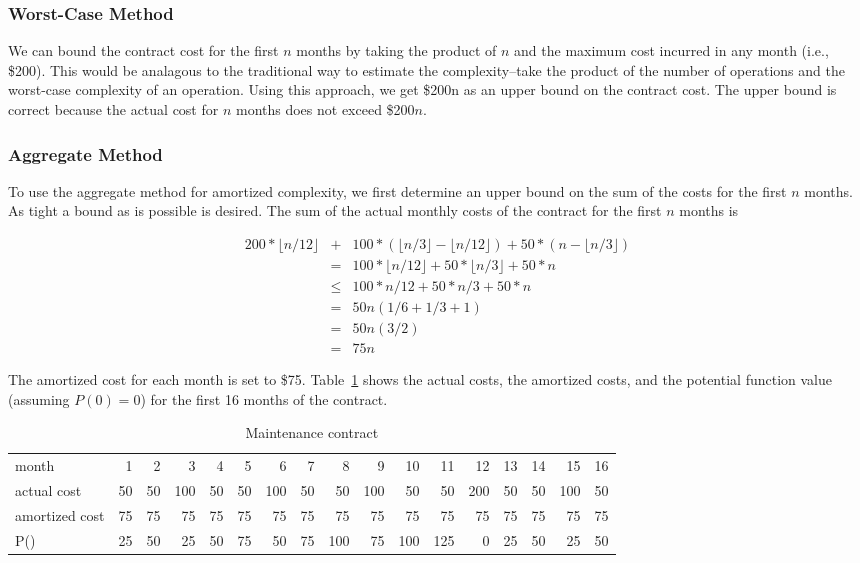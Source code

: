 \subsubsection*{Worst-Case Method}
We can bound the contract cost
for the first $n$ months by taking the product
of $n$ and the maximum cost incurred in any month
(i.e., \$200). This would be analagous to
the traditional way
to estimate the complexity--take the product of the number of operations and the
worst-case complexity of an operation.
Using this approach, we get \$200n as an upper
bound on the
contract cost. The upper bound is correct because the actual cost
for $n$ months does not exceed \$200$n$.

\subsubsection*{Aggregate Method}
To use the aggregate method for amortized complexity, we first
determine an upper bound on the sum of the costs for the first
$n$ months. As tight a bound as is possible is desired.
The sum of the actual monthly costs of the contract for
the first $n$ months is

\begin{eqnarray*}
200*\lfloor n/12\rfloor &+& 100*(\lfloor n/3\rfloor - \lfloor n/12\rfloor) + 50*(n - \lfloor n/3\rfloor)\\
&=& 100*\lfloor n/12\rfloor + 50*\lfloor n/3\rfloor + 50*n\\
&\leq& 100*n/12 + 50*n/3 + 50*n\\
&=& 50n(1/6 + 1/3 + 1)\\
&=& 50n(3/2)\\
&=& 75n
\end{eqnarray*}

The amortized cost for each month is set to \$75.
Table~\ref{table:contract} shows the actual costs, the amortized costs,
and the potential function value (assuming $P(0) = 0$)
for the first 16 months of the contract.

\begin{table}
\begin{tabular}{|l | r r r r r r r r r r r r r r r r|}
month&1&2&3&4&5&6&7&8&9&10&11&12&13&14&15&16\\
actual cost&50&50&100&50&50&100&50&50&100&50&50&200&50&50&100&50\\
amortized cost&75&75&75&75&75&75&75&75&75&75&75&75&75&75&75&75\\
P()&25&50&25&50&75&50&75&100&75&100&125&0&25&50&25&50\\
\end{tabular}
\caption{Maintenance contract\label{table:contract}}
\end{table}


